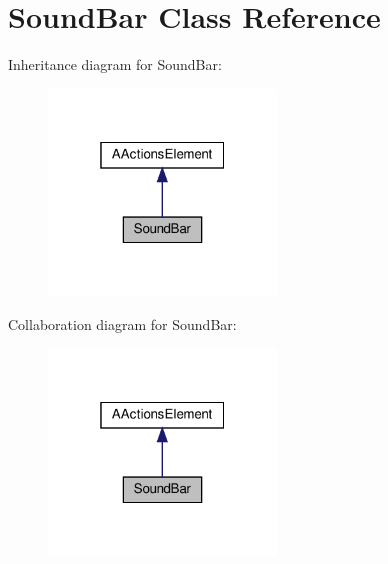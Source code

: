 \hypertarget{classSoundBar}{}\section{Sound\+Bar Class Reference}
\label{classSoundBar}


Inheritance diagram for Sound\+Bar\+:
\nopagebreak
\begin{figure}[H]
\begin{center}
\leavevmode
\includegraphics[width=172pt]{classSoundBar__inherit__graph}
\end{center}
\end{figure}


Collaboration diagram for Sound\+Bar\+:
\nopagebreak
\begin{figure}[H]
\begin{center}
\leavevmode
\includegraphics[width=172pt]{classSoundBar__coll__graph}
\end{center}
\end{figure}
